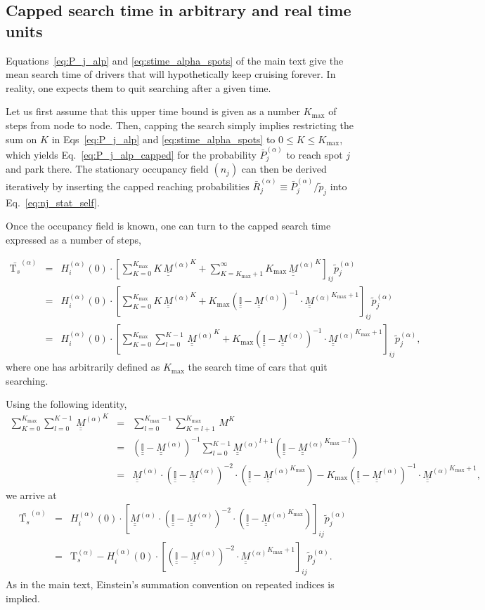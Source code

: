 \documentclass[trsc,reprint]{informs3}
\newcommand{\uul}[1]{\underline{\underline{#1}}}
\newcommand{\alp}{^{(\alpha)}}
\newcommand{\Id}{\uul{\mathbb{I}}}
\newcommand{\Ma}{ {\uul{M}\alp}}
\newcommand{\Tk}{\mathrm{T}_s}
\newcommand{\AN}[1]{#1}
\begin{document}
\begin{APPENDICES}
\subsection{Capped search time in arbitrary and real time units \label{sec:app_capped_search} }

Equations~\ref{eq:P_j_alp} and \ref{eq:stime_alpha_spots} of the main text give the mean search time
of drivers that will hypothetically keep cruising forever. In reality, one expects them to quit searching after a given time. 

Let us first assume that this upper time bound is given as a number $K_{\max}$ of steps from node to node. Then, capping the search simply implies restricting the sum on $K$ in Eqs~\ref{eq:P_j_alp} and \ref{eq:stime_alpha_spots} to $0\leqslant K \leqslant K_{\max}$, which yields Eq.~\ref{eq:P_j_alp_capped} for the probability $\bar{P}_j\alp$ to reach spot $j$ and park there. The stationary occupancy field $(n_j)$ can then
be derived iteratively by inserting the capped reaching probabilities $\bar{R}_j\alp\equiv \bar{P}_j\alp / \tilde{p}_j$  into Eq.~\ref{eq:nj_stat_self}. 

Once the occupancy field is known, one can turn to the capped search time \AN{expressed as a number of steps},

\begin{eqnarray*}
\bar{\Tk}^{(\alpha)} & = & H_i\alp(0)\cdot\left[\sum_{K=0}^{K_{\max}}K\,\Ma^{K}+\sum_{K=K_{\max}+1}^{\infty}K_{\max}\,\Ma^{K}\right]_{ij} \tilde{p}\alp_j\\
 & = & H_i\alp(0)\cdot\left[\sum_{K=0}^{K_{\max}}K\,\Ma^{K}+K_{\max}\left(\Id-\Ma\right)^{-1}\cdot \Ma^{K_{\max}+1}\right]_{ij} \tilde{p}\alp_j\\
 & = & H_i\alp(0)\cdot\left[\sum_{K=0}^{K_{\max}}\sum_{l=0}^{K-1}\,\Ma^{K}+K_{\max}\left(\Id-\Ma\right)^{-1}\cdot \Ma^{K_{\max}+1}\right]_{ij} \tilde{p}\alp_j,
\end{eqnarray*}
where one has arbitrarily defined as  $K_{\max}$ the search time of cars that quit searching.

Using the following identity,
\begin{eqnarray*}
\sum_{K=0}^{K_{\max}}\sum_{l=0}^{K-1}\,\Ma^{K} & = & \sum_{l=0}^{K_{\max}-1}\sum_{K=l+1}^{K_{\max}}\,M^{K}\\
 & = & (\Id-\Ma)^{-1}\sum_{l=0}^{K-1}\Ma^{l+1}\left(\Id-\Ma^{K_{\max}-l}\right)\\
 & = & \Ma \cdot (\Id-\Ma)^{-2}\cdot (\Id-\Ma^{K_{\max}})-K_{\max} (\Id-\Ma)^{-1} \cdot \Ma^{K_{\max}+1} ,
\end{eqnarray*}
we arrive at 
\begin{eqnarray}
\bar{\Tk}^{(\alpha)} & = & H_i\alp(0)\cdot\left[ \Ma \cdot (\Id-\Ma)^{-2} \cdot (\Id-\Ma^{K_{\max}})\right]_{ij} \tilde{p}\alp_j \nonumber \\
 & = & \Tk\alp-H_i\alp(0)\cdot\left[ (\Id-\Ma)^{-2} \cdot \Ma^{K_{\max}+1}\right]_{ij} \tilde{p}\alp_j.
  \label{eq:SI_stime_spots_capped}
\end{eqnarray}
As in the main text, Einstein's summation convention on repeated indices is implied.


\end{APPENDICES}
\end{document}
